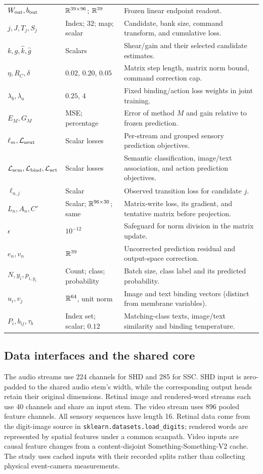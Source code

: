\begin{longtable}{@{}p{.21\linewidth}p{.27\linewidth}p{.46\linewidth}@{}}
$W_{\rm out},b_{\rm out}$ & $\mathbb{R}^{39\times96}$; $\mathbb{R}^{39}$ & Frozen linear endpoint readout.\\
$j,J,T_j,S_j$ & Index; $32$; map; scalar & Candidate, bank size, command transform, and cumulative loss.\\
$k,g,\hat k,\hat g$ & Scalars & Shear/gain and their selected candidate estimates.\\
$\eta,R_C,\delta$ & $0.02$, $0.20$, $0.05$ & Matrix step length, matrix norm bound, command correction cap.\\
$\lambda_b,\lambda_a$ & $0.25$, $4$ & Fixed binding/action loss weights in joint training.\\
$E_M,G_M$ & MSE; percentage & Error of method $M$ and gain relative to frozen prediction.\\
$\ell_m,\mathcal L_{\rm next}$ & Scalar losses & Per-stream and grouped sensory prediction objectives.\\
$\mathcal L_{\rm sem},\mathcal L_{\rm bind},\mathcal L_{\rm act}$ & Scalar losses & Semantic classification, image/text association, and action prediction objectives.\\
$\ell_{n,j}$ & Scalar & Observed transition loss for candidate $j$.\\
$L_n,A_n,C'$ & Scalar; $\mathbb{R}^{96\times30}$; same & Matrix-write loss, its gradient, and tentative matrix before projection.\\
$\epsilon$ & $10^{-12}$ & Safeguard for norm division in the matrix update.\\
$e_n,v_n$ & $\mathbb{R}^{39}$ & Uncorrected prediction residual and output-space correction.\\
$N,y_i,p_{i,y_i}$ & Count; class; probability & Batch size, class label and its predicted probability.\\
$u_i,v_j$ & $\mathbb{R}^{64}$, unit norm & Image and text binding vectors (distinct from membrane variables).\\
$P_i,b_{ij},\tau_b$ & Index set; scalar; $0.12$ & Matching-class texts, image/text similarity and binding temperature.\\
\bottomrule
\end{longtable}

\subsection{Data interfaces and the shared core}
The audio streams use 224 channels for SHD and 285 for SSC. SHD input is
zero-padded to the shared audio stem's width, while the corresponding output
heads retain their original dimensions. Retinal image and rendered-word
streams each use 40 channels and share an input stem. The video stream uses
896 pooled feature channels. All sensory sequences have length 16. Retinal
data come from the digit-image source in \texttt{sklearn.datasets.load\_digits};
rendered words are represented by spatial features under a common scanpath.
Video inputs are causal feature changes from a content-disjoint
Something-Something-V2 cache. The study uses cached inputs with their recorded
splits rather than collecting physical event-camera measurements.

